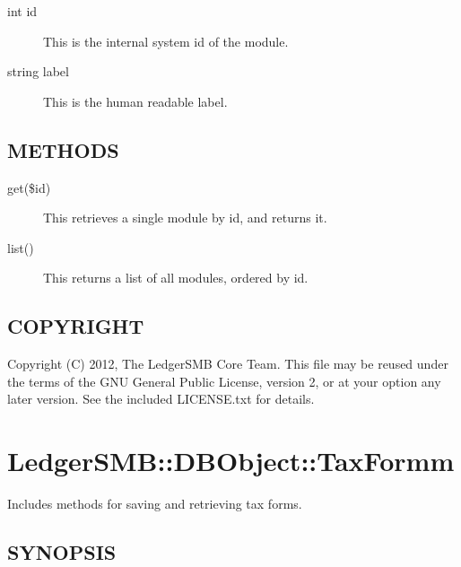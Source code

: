 \begin{description}
\begin{description}
\begin{description}
\begin{description}
\begin{description}
\begin{description}
\begin{description}
\begin{description}
\begin{description}
\begin{description}
\begin{description}
\item[{int id}] \mbox{}

This is the internal system id of the module.


\item[{string label}] \mbox{}

This is the human readable label.

\end{description}
\subsection*{METHODS\label{LedgerSMB::DBObject::App_Module_-_-_Application_Module_Lists_for_LedgerSMB_METHODS}}
\begin{description}

\item[{get(\$id)}] \mbox{}

This retrieves a single module by id, and returns it.


\item[{list()}] \mbox{}

This returns a list of all modules, ordered by id.

\end{description}
\subsection*{COPYRIGHT\label{LedgerSMB::DBObject::App_Module_-_-_Application_Module_Lists_for_LedgerSMB_COPYRIGHT}}


Copyright (C) 2012, The LedgerSMB Core Team.  This file may be reused under the terms of
the GNU General Public License, version 2, or at your option any later version.  See
the included LICENSE.txt for details.

\section{LedgerSMB::DBObject::TaxFormm\label{LedgerSMB::DBObject::TaxFormm}}


Includes methods for saving and retrieving tax forms.

\subsection*{SYNOPSIS\label{LedgerSMB::DBObject::TaxFormm_SYNOPSIS}}



\end{description}
\end{description}
\end{description}
\end{description}
\end{description}
\end{description}
\end{description}
\end{description}
\end{description}
\end{description}
